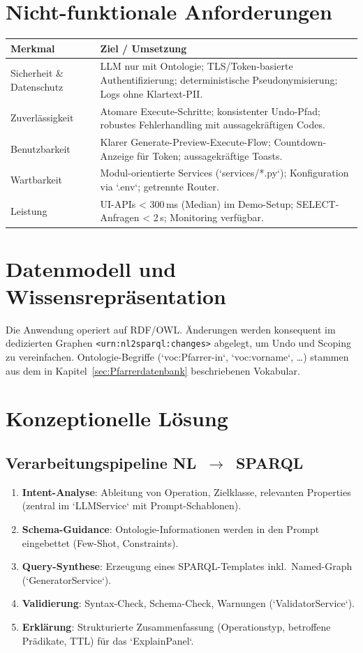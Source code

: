 \section{Nicht-funktionale Anforderungen}
\begin{center}
\begin{tabular}{p{}p{}}
\toprule
\textbf{Merkmal} & \textbf{Ziel / Umsetzung} \\
\midrule
Sicherheit \& Datenschutz & LLM nur mit Ontologie; TLS/Token-basierte Authentifizierung; deterministische Pseudonymisierung; Logs ohne Klartext-PII. \\
Zuverlässigkeit & Atomare Execute-Schritte; konsistenter Undo-Pfad; robustes Fehlerhandling mit aussagekräftigen Codes. \\
Benutzbarkeit & Klarer Generate-Preview-Execute-Flow; Countdown-Anzeige für Token; aussagekräftige Toasts. \\
Wartbarkeit & Modul-orientierte Services (`services/*.py`); Konfiguration via `.env`; getrennte Router. \\
Leistung & UI-APIs \textless{} 300\,ms (Median) im Demo-Setup; SELECT-Anfragen \textless{} 2\,s; Monitoring verfügbar. \\
\bottomrule
\end{tabular}
\end{center}

\section{Datenmodell und Wissensrepräsentation}
Die Anwendung operiert auf RDF/OWL. Änderungen werden konsequent im dedizierten Graphen \texttt{<urn:nl2sparql:changes>} abgelegt, um Undo und Scoping zu vereinfachen. Ontologie-Begriffe (`voc:Pfarrer-in`, `voc:vorname`, …) stammen aus dem in Kapitel~\ref{sec:Pfarrerdatenbank} beschriebenen Vokabular.

\section{Konzeptionelle Lösung}

\subsection{Verarbeitungspipeline NL~$\rightarrow$~SPARQL}
\begin{enumerate}
  \item \textbf{Intent-Analyse}: Ableitung von Operation, Zielklasse, relevanten Properties (zentral im `LLMService` mit Prompt-Schablonen).
  \item \textbf{Schema-Guidance}: Ontologie-Informationen werden in den Prompt eingebettet (Few-Shot, Constraints).
  \item \textbf{Query-Synthese}: Erzeugung eines SPARQL-Templates inkl.\ Named-Graph (`GeneratorService`).
  \item \textbf{Validierung}: Syntax-Check, Schema-Check, Warnungen (`ValidatorService`).
  \item \textbf{Erklärung}: Strukturierte Zusammenfassung (Operationstyp, betroffene Prädikate, TTL) für das `ExplainPanel`.
\end{enumerate}

